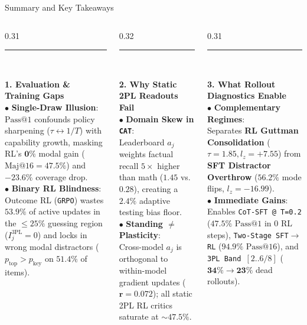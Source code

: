 \documentclass[aspectratio=169, 10pt]{beamer}
\newcommand{\secblock}[2]{%
  {\color{#1}\rule{\linewidth}{1.2pt}}\\[1.0mm]
  {\footnotesize #2\par}%
}
\begin{document}
\begin{frame}{Summary and Key Takeaways}
  \vspace{1mm}
  \begin{columns}[T, onlytextwidth]
    \begin{column}{0.31\textwidth}
      \secblock{RedGRPO}{
        \textbf{\color{RedGRPO}\small 1. Evaluation \& Training Gaps}\\[2mm]
        $\bullet$ \textbf{Single-Draw Illusion}:\\
        $\mathrm{Pass@1}$ confounds policy sharpening ($\tau \leftrightarrow 1/T$) with capability growth, masking RL's $\mathbf{0\%}$ modal gain ($\mathrm{Maj@16}=47.5\%$) and $\mathbf{-23.6\%}$ coverage drop.\\[2.5mm]
        $\bullet$ \textbf{Binary RL Blindness}:\\
        Outcome RL (\texttt{GRPO}) wastes $\mathbf{53.9\%}$ of active updates in the $\le 25\%$ guessing region ($I_j^{\mathrm{3PL}}=0$) and locks in wrong modal distractors ($p_{\mathrm{top}} > p_{\mathrm{key}}$ on $\mathbf{51.4\%}$ of items).
      }
    \end{column}
    \begin{column}{0.32\textwidth}
      \secblock{AmberIRT}{
        \textbf{\color{AmberIRT}\small 2. Why Static 2PL Readouts Fail}\\[2mm]
        $\bullet$ \textbf{Domain Skew in \texttt{CAT}}:\\
        Leaderboard $a_j$ weights factual recall $5\times$ higher than math ($1.45$ vs.\ $0.28$), creating a $\mathbf{2.4\%}$ adaptive testing bias floor.\\[2.5mm]
        $\bullet$ \textbf{Standing $\neq$ Plasticity}:\\
        Cross-model $a_j$ is orthogonal to within-model gradient updates ($\mathbf{r=0.072}$); all static 2PL RL critics saturate at $\mathbf{\sim 47.5\%}$.
      }
    \end{column}
    \begin{column}{0.31\textwidth}
      \secblock{BlueSFT}{
        \textbf{\color{BlueSFT}\small 3. What Rollout Diagnostics Enable}\\[2mm]
        $\bullet$ \textbf{Complementary Regimes}:\\
        Separates \textbf{RL Guttman Consolidation} ($\tau=1.85, l_z=\mathbf{+7.55}$) from \textbf{SFT Distractor Overthrow} ($\mathbf{56.2\%}$ mode flips, $l_z=\mathbf{-16.99}$).\\[2.5mm]
        $\bullet$ \textbf{Immediate Gains}:\\
        Enables \texttt{CoT-SFT @ T=0.2} ($\mathbf{47.5\%}$ $\mathrm{Pass@1}$ in 0 RL steps), \texttt{Two-Stage SFT$\to$RL} ($\mathbf{94.9\%}$ $\mathrm{Pass@16}$), and \texttt{3PL Band $[2..6/8]$} ($\mathbf{34\%\to 23\%}$ dead rollouts).
      }
    \end{column}
  \end{columns}
\end{frame}
\end{document}
